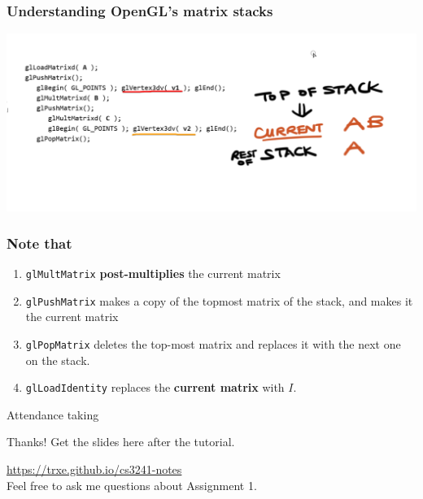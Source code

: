 \documentclass{beamer}
\begin{document}
\begin{frame}
    \frametitle{Understanding OpenGL's matrix stacks}

    \begin{center}
        \includegraphics[scale=0.4]{q8-5.png}
    \end{center}

\end{frame}

\begin{frame}
    \frametitle{Note that}

    \begin{enumerate}
        \item \texttt{glMultMatrix} \textbf{post-multiplies} the current matrix
        \item \texttt{glPushMatrix} makes a copy of the topmost matrix of the stack, and makes it the current matrix
        \item \texttt{glPopMatrix} deletes the top-most matrix and replaces it with the next one on the stack.
        \item \texttt{glLoadIdentity} replaces the \textbf{current matrix} with $I$.
    \end{enumerate}

\end{frame}

\begin{frame}
    \AlegreyaExtraBold \LARGE
    Attendance taking
\end{frame}

\ThankYou
\begin{frame}
    Thanks! Get the slides here after the tutorial.\\
    \vspace{2em}
    \scalebox{3}{\faGithub}\par\bigskip
    \url{https://trxe.github.io/cs3241-notes}\\
    \vspace{3em}
    {\small Feel free to ask me questions about Assignment 1.  }
\end{frame}
\end{document}
